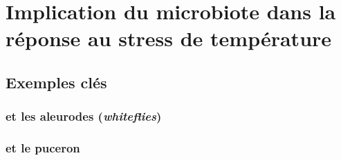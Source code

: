 \chapter{Implication du microbiote dans la réponse au stress de température} %
\label{sec:implicationµbiote}
	
	\section{Exemples clés} %
	\label{sec:exemples}
		

		\subsection{ et les aleurodes (\textit{whiteflies})} %
		\label{sub:rickettsia_et_les_aleurodes_}
			

		\subsection{ et le puceron} %
		\label{sub:exemple_buchnera}
			
		
		
	